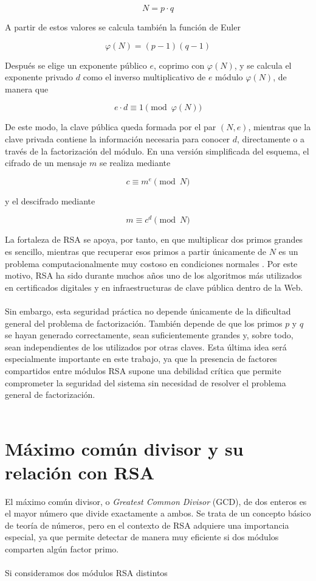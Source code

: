 \[
N = p \cdot q
\]

A partir de estos valores se calcula también la función de Euler

\[
\varphi(N) = (p-1)(q-1)
\]

Después se elige un exponente público \(e\), coprimo con \(\varphi(N)\), y se calcula el exponente privado \(d\) como el inverso multiplicativo de \(e\) módulo \(\varphi(N)\), de manera que

\[
e \cdot d \equiv 1 \pmod{\varphi(N)}
\]

De este modo, la clave pública queda formada por el par \((N,e)\), mientras que la clave privada contiene la información necesaria para conocer \(d\), directamente o a través de la factorización del módulo. En una versión simplificada del esquema, el cifrado de un mensaje \(m\) se realiza mediante

\[
c \equiv m^e \pmod{N}
\]

y el descifrado mediante

\[
m \equiv c^d \pmod{N}
\]

La fortaleza de RSA se apoya, por tanto, en que multiplicar dos primos grandes es sencillo, mientras que recuperar esos primos a partir únicamente de \(N\) es un problema computacionalmente muy costoso en condiciones normales \cite{rivest1978method}. Por este motivo, RSA ha sido durante muchos años uno de los algoritmos más utilizados en certificados digitales y en infraestructuras de clave pública dentro de la Web.
\\
\\
Sin embargo, esta seguridad práctica no depende únicamente de la dificultad general del problema de factorización. También depende de que los primos \(p\) y \(q\) se hayan generado correctamente, sean suficientemente grandes y, sobre todo, sean independientes de los utilizados por otras claves. Esta última idea será especialmente importante en este trabajo, ya que la presencia de factores compartidos entre módulos RSA supone una debilidad crítica que permite comprometer la seguridad del sistema sin necesidad de resolver el problema general de factorización.
\\
\\

\section{Máximo común divisor y su relación con RSA}

El máximo común divisor, o \textit{Greatest Common Divisor} (GCD), de dos enteros es el mayor número que divide exactamente a ambos. Se trata de un concepto básico de teoría de números, pero en el contexto de RSA adquiere una importancia especial, ya que permite detectar de manera muy eficiente si dos módulos comparten algún factor primo.
\\
\\
Si consideramos dos módulos RSA distintos

